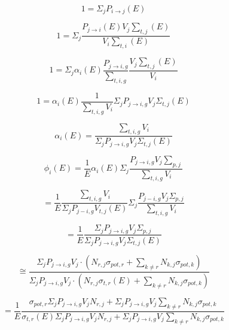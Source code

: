 \documentclass[10pt]{article}
\begin{document}
\begin{equation}1=\Sigma_{j}P_{i\rightarrow j}(E)\end{equation}

\begin{equation}1=\Sigma_j\frac{P_{j\rightarrow i}(E)V_{j}\sum\limits_{t,j}(E)}{V_{i}\sum\limits_{t,i}(E)}\end{equation}

\begin{equation}1=\Sigma_j\alpha_{i}(E)\frac{P_{j\rightarrow i,g}}{\sum\limits_{t,i,g}}\frac{V_{j}\sum\limits_{t,j}(E)}{V_{i}}\end{equation}



\begin{equation}1=\alpha_{i}(E)\frac{1}{\sum\limits_{t,i,g}V_{i}}\Sigma_jP_{j\rightarrow i,g}V_{j}\Sigma_{t,j}(E)\end{equation}

\begin{equation}\alpha_{i}(E)=\frac{\sum\limits_{t,i,g}V_{i}}{\Sigma_jP_{j\rightarrow i,g}V_{j}\Sigma_{t,j}(E)}\end{equation}

\begin{equation}\phi_{i}(E)=\frac{1}{E}\alpha_{i}(E)\Sigma_j\frac{P_{j\rightarrow i,g}V_{j}\sum\limits_{p,j}}{\sum\limits_{t,i,g}V_{i}}\end{equation}

\begin{equation}=\frac{1}{E}\frac{\sum\limits_{t,i,g}V_{i}}{\Sigma_jP_{j-i,g}V_{t,j}(E)}\Sigma_j\frac{P_{j-i,g}V_{j}\Sigma_{p,j}}{\sum\limits_{t,i,g}V_{i}}\end{equation}

\begin{equation}=\frac{1}{E}\frac{\Sigma_jP_{j\rightarrow i,g}V_{j}\Sigma_{p,j}}{\Sigma_jP_{j\rightarrow i,g}V_{j}\Sigma_{t,j}(E)}\end{equation}

\begin{equation}\cong\frac{\Sigma_jP_{j\rightarrow i,g}V_{j}\cdot\left(N_{r,j}\sigma_{pot,r}+\sum\limits_{k\neq r}N_{k,j}\sigma_{pot,k}\right)}{\Sigma_jP_{j\rightarrow i,g}V_{j}\cdot\left(N_{r,j}\sigma_{t,r}(E)+\sum\limits_{k\neq r}N_{k,j}\sigma_{pot,k}\right)}\end{equation}

\begin{equation}=\frac{1}{E}\frac{\sigma_{pot,r}\Sigma_jP_{j\rightarrow i,g}V_{j}N_{r,j}+\Sigma_jP_{j\rightarrow i,g}V_{j}\sum\limits_{k\neq r}N_{k,j}\sigma_{pot,k}}{\sigma_{t,r}(E)\Sigma_jP_{j\rightarrow i,g}V_{j}N_{r,j}+\Sigma_jP_{j\rightarrow i,g}V_{j}\sum\limits_{k\neq r}N_{k,j}\sigma_{pot,k}}\end{equation}
\end{document}
